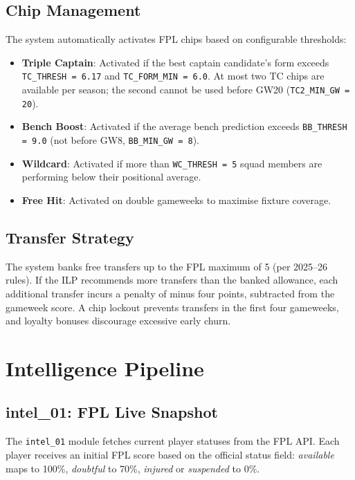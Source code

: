 \subsection{Chip Management}

The system automatically activates FPL chips based on configurable thresholds:

\begin{itemize}
  \item \textbf{Triple Captain}: Activated if the best captain candidate's form exceeds \texttt{TC\_THRESH = 6.17} and \texttt{TC\_FORM\_MIN = 6.0}. At most two TC chips are available per season; the second cannot be used before GW20 (\texttt{TC2\_MIN\_GW = 20}).
  \item \textbf{Bench Boost}: Activated if the average bench prediction exceeds \texttt{BB\_THRESH = 9.0} (not before GW8, \texttt{BB\_MIN\_GW = 8}).
  \item \textbf{Wildcard}: Activated if more than \texttt{WC\_THRESH = 5} squad members are performing below their positional average.
  \item \textbf{Free Hit}: Activated on double gameweeks to maximise fixture coverage.
\end{itemize}

\subsection{Transfer Strategy}

The system banks free transfers up to the FPL maximum of 5 (per 2025--26 rules). If the ILP recommends more transfers than the banked allowance, each additional transfer incurs a penalty of minus four points, subtracted from the gameweek score. A chip lockout prevents transfers in the first four gameweeks, and loyalty bonuses discourage excessive early churn.

\section{Intelligence Pipeline}

\subsection{intel\_01: FPL Live Snapshot}

The \texttt{intel\_01} module fetches current player statuses from the FPL API. Each player receives an initial FPL score based on the official status field: \textit{available} maps to 100\%, \textit{doubtful} to 70\%, \textit{injured} or \textit{suspended} to 0\%.

